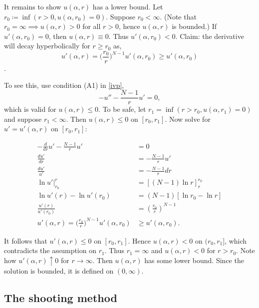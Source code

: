 It remains to show $u(\alpha,r)$ has a lower bound. Let $r_0\coloneqq\inf(r>0,u(\alpha,r_0)=0).$ Suppose $r_0<\infty$. (Note that $r_0=\infty\implies u(\alpha,r)>0$ for all $r>0$, hence $u(\alpha,r)$ is bounded.) If $u'(\alpha,r_0)=0$, then $u(\alpha,r)\equiv0$. Thus $u'(\alpha,r_0)<0$. Claim: the derivative will decay hyperbolically for $r\geq r_0$ as,  $$u'(\alpha,r)=\big(\frac{r_0}{r}\big)^{N-1}u'(\alpha,r_0)\geq u'(\alpha,r_0)$$.

To see this, use condition (A1) in \eqref{ivp},
$$-u''-\frac{N-1}{r}u'=0,$$%
which is valid for $u(\alpha,r)\leq0.$ To be safe, let $r_1=\inf(r>r_0,u(\alpha,r_1)=0)$ and suppose $r_1<\infty$. Then $u(\alpha,r)\leq0$ on $[r_0,r_1]$. Now solve for $u'=u'(\alpha,r)$ on $[r_0,r_1]$:

\begin{align*}
-\frac{d}{dr}u'-\frac{N-1}{r}u'&=0\\
\frac{du'}{dr}&=-\frac{N-1}{r}u'\\
\frac{du'}{u'}&=-\frac{N-1}{r}dr\\
\left.\ln{u'}\right\rvert_{r_0}^r&=\left[(N-1)\ln{r}\right]_r^{r_0}\\
\ln{u'(r)}-\ln{u'(r_0)}&=(N-1)\left[\ln{r_0}-\ln{r}\right]\\
\frac{u'(r)}{u'(r_0)}&=\left(\frac{r_0}{r}\right)^{N-1}\\
u'(\alpha,r)=\big(\frac{r_0}{r}\big)^{N-1}u'(\alpha,r_0)&\geq u'(\alpha,r_0).%
\end{align*}

It follows that $u'(\alpha,r)\leq0$ on $[r_0,r_1]$. Hence $u(\alpha,r)<0$ on $(r_0,r_1]$, which contradicts the assumption on $r_1$. Thus $r_1=\infty$ and $u(\alpha,r)<0$ for $r>r_0$. Note how $u'(\alpha,r)\uparrow0$ for $r\to\infty$. Then $u(\alpha,r)$ has some lower bound. Since the solution is bounded, it is defined on $(0,\infty)$.

\subsection{The shooting method}\hfill

